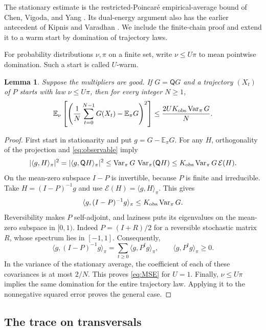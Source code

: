 \documentclass[11pt]{article}
\newtheorem{lemma}[theorem]{Lemma}
\theoremstyle{definition}
\newcommand{\E}{\mathbb E}
\newcommand{\Var}{\operatorname{Var}}
\newcommand{\calE}{\mathcal E}
\newcommand{\inner}[2]{\langle #1,#2\rangle}
\newcommand{\Qproj}{\mathsf Q}
\begin{document}
The stationary estimate is the restricted-Poincar\'e empirical-average
bound of Chen, Vigoda, and Yang
\cite[Theorem~5(ii) and Section~3.6]{CVY2026}.  Its dual-energy argument
also has the earlier antecedent of Kipnis and Varadhan
\cite[Section~3]{KipnisVaradhan1985}.  We include the finite-chain proof
and extend it to a warm start by domination of trajectory laws.

For probability distributions $\nu,\pi$ on a finite set, write
$\nu\le U\pi$ to mean pointwise domination.  Such a start is called
$U$-warm.

\begin{lemma}\label{lem:timeaverages}
Suppose the multipliers are good.  If $G=\Qproj G$ and a trajectory
$(X_t)$ of $P$ starts with law $\nu\le U\pi$, then for every integer
$N\ge1$,
\begin{equation}\label{eq:MSE}
 \E_\nu\left[\left(\frac1N\sum_{t=0}^{N-1}G(X_t)-\E_\pi G\right)^2\right]
 \le\frac{2UK_{\rm obs}\Var_\pi G}{N}.
\end{equation}
\end{lemma}

\begin{proof}
First start in stationarity and put $g=G-\E_\pi G$.  For any $H$,
orthogonality of the projection and \eqref{eq:observable} imply
\[
 |\inner{g}{H}_\pi|^2
 =|\inner{g}{\Qproj H}_\pi|^2
 \le\Var_\pi G\,\Var_\pi(\Qproj H)
 \le K_{\rm obs}\Var_\pi G\,\calE(H).
\]
On the mean-zero subspace $I-P$ is invertible, because $P$ is finite and
irreducible.  Take $H=(I-P)^{-1}g$ and use
$\calE(H)=\inner{g}{H}_\pi$.  This gives
\begin{equation}\label{eq:resolvent}
 \inner{g}{(I-P)^{-1}g}_\pi\le K_{\rm obs}\Var_\pi G.
\end{equation}
Reversibility makes $P$ self-adjoint, and laziness puts its eigenvalues
on the mean-zero subspace in $[0,1)$.  Indeed $P=(I+R)/2$ for a
reversible stochastic matrix $R$, whose spectrum lies in $[-1,1]$.
Consequently,
\[
 \inner{g}{(I-P)^{-1}g}_\pi
   =\sum_{t\ge0}\inner{g}{P^tg}_\pi,
 \qquad \inner{g}{P^tg}_\pi\ge0.
\]
In the variance of the stationary average, the coefficient of each of
these covariances is at most $2/N$.  This proves \eqref{eq:MSE} for
$U=1$.  Finally, $\nu\le U\pi$ implies the same domination for the
entire trajectory law.  Applying it to the nonnegative squared error
proves the general case.
\end{proof}

\subsection{The trace on transversals}
\end{document}
